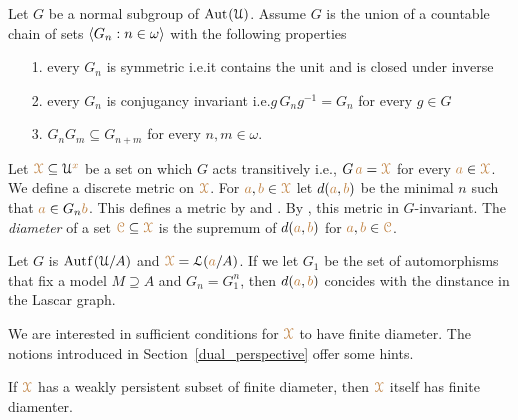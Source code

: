 Let $G$ be a normal subgroup of ${\rm Aut\kern.15ex}(\EuScript U)$.
Assume $G$ is the union of a countable chain of sets $\langle G_n:n\in\omega\rangle$ with the following properties
\begin{itemize}
  \item[1.] every $G_n$ is symmetric i.e.\@ it contains the unit and is closed under inverse
  \item[2.] every $G_n$ is conjugancy invariant i.e.\@ $g\,G_ng^{-1}=G_n$ for every $g\in G$
  \item[3.] $G_nG_m\subseteq  G_{n+m}$ for every $n,m\in\omega$.
\end{itemize}

Let ${\color{brown}\EuScript X}\subseteq\EuScript U^{\color{brown} x}$ be a set on which $G$ acts transitively i.e., $G\,{\color{brown} a}={\color{brown}\EuScript X}$ for every ${\color{brown} a}\in{\color{brown}\EuScript X}$.
We define a discrete metric on ${\color{brown}\EuScript X}$. 
For ${\color{brown} a},{\color{brown} b}\in{\color{brown}\EuScript X}$ let $d({\color{brown} a},{\color{brown} b})$ be the minimal $n$ such that ${\color{brown} a}\in G_n{\color{brown} b}$.
This defines a metric by  and .
By , this metric in $G$-invariant.
The \emph{diameter\/} of a set ${\color{brown}\EuScript C}\subseteq{\color{brown}\EuScript X}$ is the supremum of $d({\color{brown} a},{\color{brown} b})$ for ${\color{brown} a},{\color{brown} b}\in{\color{brown}\EuScript C}$.

\begin{example}
  Let $G$ is $\mathord{\rm Aut\kern.15ex{f}\kern.15ex}(\EuScript U/A)$ and ${\color{brown}\EuScript X}=\EuScript L({\color{brown} a}/A)$.
  If we let $G_1$ be the set of automorphisms that fix a model $M\supseteq A$ and $G_n=G_1^n$, then $d({\color{brown} a},{\color{brown} b})$ concides with the dinstance in the Lascar graph.
\end{example} 

We are interested in sufficient conditions for ${\color{brown}\EuScript X}$ to have finite diameter.
The notions introduced in Section~\ref{dual_perspective} offer some hints.

\begin{proposition}
  If ${\color{brown}\EuScript X}$ has a weakly persistent subset of finite diameter, then ${\color{brown}\EuScript X}$ itself has finite diamenter.
\end{proposition}

